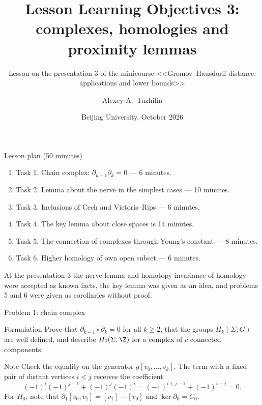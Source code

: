 \documentclass[aspectratio=169,11pt]{beamer}
\title[Lesson 3 Objectives]{Lesson Learning Objectives \textup{3}: complexes, homologies and proximity lemmas}
\subtitle{Lesson on the presentation \textup{3} of the minicourse <<Gromov--Hausdorff distance: applications and lower bounds>>}
\author{Alexey A.~Tuzhilin}
\date{Beijing University, October 2026}
\begin{document}
\begin{frame}
\titlepage
\end{frame}

\begin{frame}{Lesson plan (\textup{50} minutes)}
\begin{enumerate}
\item Task \textup{1}. Chain complex\textup{:} $\partial_{k-1}\partial_k = 0$ --- \textup{6} minutes.
\item Task \textup{2}. Lemma about the nerve in the simplest cases --- \textup{10} minutes.
\item Task \textup{3}. Inclusions of Cech and Vietoris--Rips --- \textup{6} minutes.
\item Task \textup{4}. The key lemma about close spaces is \textup{14} minutes.
\item Task \textup{5}. The connection of complexes through Young's constant --- \textup{8} minutes.
\item Task \textup{6}. Higher homology of own open subset --- \textup{6} minutes.
\end{enumerate}
\medskip
At the presentation \textup{3} the nerve lemma and homotopy invariance of homology were accepted as known facts, the key lemma was given as an idea, and problems \textup{5} and \textup{6} were given as corollaries without proof.
\end{frame}

\begin{frame}{Problem \textup{1}: chain complex}
\begin{block}{Formulation}
Prove that $\partial_{k-1} \circ \partial_k = 0$ for all $k \ge 2$, that the groups $H_k(\Sigma;G)$ are well defined, and describe $H_0(\Sigma;\Z)$ for a complex of $c$ connected components.
\end{block}
\begin{block}{Note}
Check the equality on the generator $g[v_0,\dots,v_k]$. The term with a fixed pair of distant vertices $i<j$ receives the coefficient
\[
(-1)^i(-1)^{j-1} + (-1)^j(-1)^i = (-1)^{i+j-1} + (-1)^{i+j} = 0 .
\]
For $H_0$, note that $\partial_1[v_0,v_1] = [v_1]-[v_0]$ and $\ker\partial_0 = C_0$.
\end{block}
\end{frame}
\end{document}
